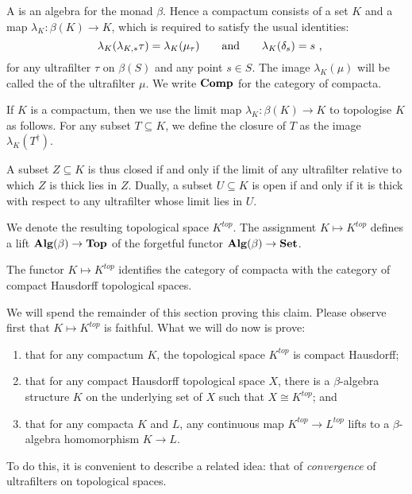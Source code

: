 \begin{dfn} \label{compactaasbetaalgebras}
	A  is an algebra for the monad $ \beta $.
	Hence a compactum consists of a set $ K $ and a map $ \lambda_K \colon \beta(K) \to K $, which is required to satisfy the usual identities:
	\[
		\lambda_K(\lambda_{K,\ast}\tau) = \lambda_K(\mu_{\tau}) \andeq{} \lambda_K(\delta_s) = s \comma
	\]
	for any ultrafilter $ \tau $ on $ \beta(S) $ and any point $ s \in S $.
	The image $ \lambda_K(\mu) $ will be called the  of the ultrafilter $\mu$.
	We write $ \textbf{\textup{Comp}} $ for the category of compacta.
\end{dfn}

\begin{cnstr} \label{turnacompactumintoatopspace}
	If $K$ is a compactum, then we use the limit map $ \lambda_K \colon \beta(K) \to K $ to topologise $ K $ as follows.
	For any subset $ T \subseteq K $, we define the closure of $ T $ as the image $ \lambda_K(T^{\dag}) $.

	A subset $ Z \subseteq K $ is thus closed if and only if the limit of any ultrafilter relative to which $ Z $ is thick lies in $ Z $.
	Dually, a subset $ U \subseteq K $ is open if and only if it is thick with respect to any ultrafilter whose limit lies in $ U $.

	We denote the resulting topological space $ K^{\textit{top}} $.
	The assignment $ K \mapsto K^{\textit{top}} $ defines a lift $ \textbf{\textup{Alg}}(\beta) \to \textbf{\textup{Top}} $ of the forgetful functor $ \textbf{\textup{Alg}}(\beta) \to \textbf{\textup{Set}} $.
\end{cnstr}

\begin{prp} \label{compactaarecompacta}
	The functor $ K \mapsto K^{\textit{top}} $ identifies the category of compacta with the category of compact Hausdorff topological spaces. 
\end{prp}

We will spend the remainder of this section proving this claim.
Please observe first that $ K \mapsto K^{\textit{top}} $ is faithful.
What we will do now is prove:
\begin{enumerate}[(1)]
	\item that for any compactum $ K $, the topological space $ K^{\textit{top}} $ is compact Hausdorff;
	\item that for any compact Hausdorff topological space $ X $, there is a $ \beta $-algebra structure $ K $ on the underlying set of $ X $ such that $ X \cong K^{\textit{top}} $; and
	\item that for any compacta $ K $ and $ L $, any continuous map $ K^{\textit{top}} \to L^{\textit{top}} $ lifts to a $ \beta $-algebra homomorphism $ K \to L$.
\end{enumerate}
To do this, it is convenient to describe a related idea: that of \emph{convergence} of ultrafilters on topological spaces.

